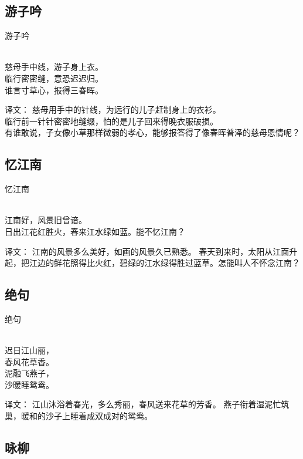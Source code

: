 \subsection{游子吟}

\noindent 游子吟

  \\

\noindent 慈母手中线，游子身上衣。\\
临行密密缝，意恐迟迟归。\\
谁言寸草心，报得三春晖。

译文：
慈母用手中的针线，为远行的儿子赶制身上的衣衫。\\
临行前一针针密密地缝缀，怕的是儿子回来得晚衣服破损。\\
有谁敢说，子女像小草那样微弱的孝心，能够报答得了像春晖普泽的慈母恩情呢？

\subsection{忆江南}

\noindent 忆江南

  \\

\noindent 江南好，风景旧曾谙。\\
日出江花红胜火，春来江水绿如蓝。能不忆江南？

译文：
江南的风景多么美好，如画的风景久已熟悉。
春天到来时，太阳从江面升起，把江边的鲜花照得比火红，碧绿的江水绿得胜过蓝草。怎能叫人不怀念江南？

\subsection{绝句}

\noindent 绝句

  \\

\noindent 迟日江山丽，\\春风花草香。\\
泥融飞燕子，\\沙暖睡鸳鸯。

译文：
江山沐浴着春光，多么秀丽，春风送来花草的芳香。
燕子衔着湿泥忙筑巢，暖和的沙子上睡着成双成对的鸳鸯。

\subsection{咏柳}

